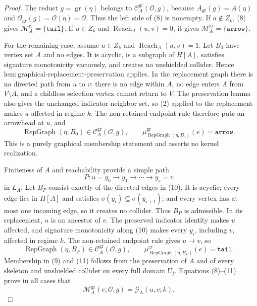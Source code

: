 \documentclass{article}
\begin{document}
\begin{proof}
The reduct \(g=\operatorname{gr}(\eta)\) belongs to \(\mathcal C_A^{\mathrm{gr}}(\mathcal O,g)\), because \(A_{\mathrm{gr}}(g)=A(\eta)\) and \(\mathcal O_{\mathrm{gr}}(g)=\mathcal O(\eta)=\mathcal O\).  Thus the left side of (8) is nonempty.  If \(u\notin Z_k\), (8) gives \(\mathcal M_A^{\mathrm{gr}}=\{\mathtt{tail}\}\).  If \(u\in Z_k\) and \(\operatorname{Reach}_A(u,v)=0\), it gives \(\mathcal M_A^{\mathrm{gr}}=\{\mathtt{arrow}\}\).

For the remaining case, assume \(u\in Z_k\) and \(\operatorname{Reach}_A(u,v)=1\).  Let \(B_0\) have vertex set \(A\) and no edges.  It is acyclic, is a subgraph of \(H[A]\), satisfies signature monotonicity vacuously, and creates no unshielded collider.  Hence \(\mathrm{lem:graphical\mbox{-}replacement\mbox{-}preservation}\) applies.  In the replacement graph there is no directed path from \(u\) to \(v\): there is no edge within \(A\), no edge enters \(A\) from \(V\setminus A\), and a childless selection vertex cannot return to \(V\).  The preservation lemma also gives the unchanged indicator-neighbor set, so (2) applied to the replacement makes \(u\) affected in regime \(k\).  The non-retained endpoint rule therefore puts an arrowhead at \(u\), and
\[
 \operatorname{RepGraph}(\eta,B_0)
 \in\mathcal C_A^{\mathrm{gr}}(\mathcal O,g),
 \qquad
 \mu^{\mathrm{gr}}_{\operatorname{RepGraph}(\eta,B_0)}(e)
 =\mathtt{arrow}.
 \tag{9}
\]
This is a purely graphical membership statement and asserts no kernel realization.

Finiteness of \(A\) and reachability provide a simple path
\[
 P:u=y_0\to y_1\to\cdots\to y_s=v
 \tag{10}
\]
in \(L_A\).  Let \(B_P\) consist exactly of the directed edges in (10).  It is acyclic; every edge lies in \(H[A]\) and satisfies \(\sigma(y_i)\subseteq\sigma(y_{i+1})\); and every vertex has at most one incoming edge, so it creates no collider.  Thus \(B_P\) is admissible.  In its replacement, \(u\) is an ancestor of \(v\).  The preserved indicator identity makes \(u\) affected, and signature monotonicity along (10) makes every \(y_i\), including \(v\), affected in regime \(k\).  The non-retained endpoint rule gives \(u\to v\), so
\[
 \operatorname{RepGraph}(\eta,B_P)
 \in\mathcal C_A^{\mathrm{gr}}(\mathcal O,g),
 \qquad
 \mu^{\mathrm{gr}}_{\operatorname{RepGraph}(\eta,B_P)}(e)
 =\mathtt{tail}.
 \tag{11}
\]
Membership in (9) and (11) follows from the preservation of \(A\) and of every skeleton and unshielded collider on every full domain \(U_j\).  Equations (8)--(11) prove in all cases that
\[
 \mathcal M_A^{\mathrm{gr}}(e;\mathcal O,g)
 =\mathcal G_A(u,v;k).
 \tag{12}
\]


\end{proof}
\end{document}
